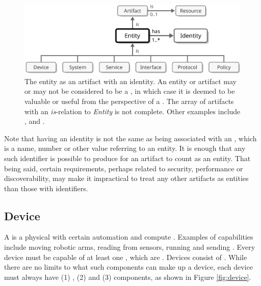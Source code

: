 \vfill

\begin{figure}[ht!]
  \centering
  \includegraphics[scale=0.9]{figures/entity}
  \caption{
    The entity as an artifact with an identity.
    An entity or artifact may or may not be considered to be a , in which case it is deemed to be valuable or useful from the perspective of a .
    The array of artifacts with an \textit{is}-relation to \textit{Entity} is not complete.
    Other examples include ,  and .
  }
  \label{fig:entity}
\end{figure}

Note that having an identity is not the same as being associated with an , which is a name, number or other value referring to an entity.
It is enough that any such identifier is possible to produce for an artifact to count as an entity.
That being said, certain  requirements, perhaps related to security, performance or discoverability, may make it impractical to treat any other artifacts as entities than those with identifiers.

\subsection{Device}
\label{sec:concepts:device}

A  is a physical  with certain automation and compute .
Examples of capabilities include moving robotic arms, reading from sensors, running  and sending .
Every device must be capable of  at least one , which are  .
Devices consist of .
While there are no limits to what such components can make up a device, each device must always have (1) , (2)  and (3)  components, as shown in Figure \ref{fig:device}.

